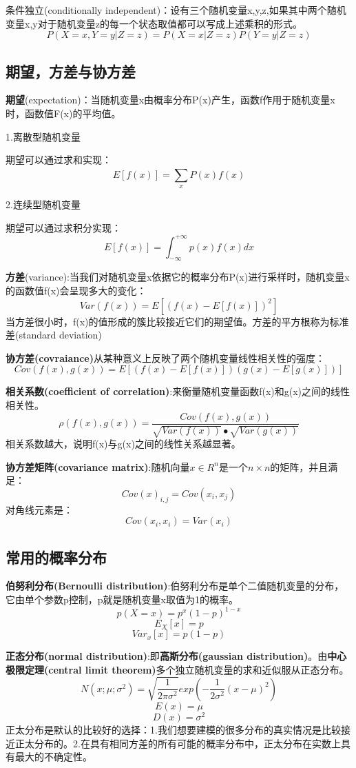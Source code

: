 \documentclass[openbib]{article}
\begin{document}
条件独立(conditionally independent)：设有三个随机变量x,y,z,如果其中两个随机变量x,y对于随机变量z的每一个状态取值都可以写成上述乘积的形式。
$$P(X=x,Y=y|Z=z)=P(X=x|Z=z)P(Y=y|Z=z)$$
\subsection{期望，方差与协方差}
\textbf{期望}(expectation)：当随机变量x由概率分布P(x)产生，函数f作用于随机变量x时，函数值F(x)的平均值。
\begin{center}
	1.离散型随机变量
\end{center}
期望可以通过求和实现：
$$E[f(x)]=\sum_{x}^{}P(x)f(x)$$
\begin{center}
	2.连续型随机变量
\end{center}
期望可以通过求积分实现：
$$E[f(x)]=\int_{-\infty}^{+\infty}p(x)f(x)dx$$

\textbf{方差}(variance):当我们对随机变量x依据它的概率分布P(x)进行采样时，随机变量x的函数值f(x)会呈现多大的变化：
$$Var(f(x))=E[(f(x)-E[f(x)])^2]$$
当方差很小时，f(x)的值形成的簇比较接近它们的期望值。方差的平方根称为标准差(standard deviation)

\textbf{协方差(covraiance)}从某种意义上反映了两个随机变量线性相关性的强度：
$$Cov(f(x),g(x))=E[(f(x)-E[f(x)])(g(x)-E[g(x)])]$$

\textbf{相关系数(coefficient of correlation)}:来衡量随机变量函数f(x)和g(x)之间的线性相关性。
$$\rho(f(x),g(x))=\frac{Cov(f(x),g(x))}{\sqrt{Var(f(x))}\bullet \sqrt{Var(g(x))}}$$
相关系数越大，说明f(x)与g(x)之间的线性关系越显著。

\textbf{协方差矩阵(covariance matrix)}:随机向量$x\in R^n$是一个$n \times n$的矩阵，并且满足：
$$Cov(x)_{i,j}=Cov(x_i, x_j)$$
对角线元素是：
$$Cov(x_i,x_i)=Var(x_i)$$
\subsection{常用的概率分布}
\textbf{伯努利分布(Bernoulli distribution)}:伯努利分布是单个二值随机变量的分布，它由单个参数p控制，p就是随机变量x取值为1的概率。
$$p(X=x)=p^x(1-p)^{1-x} $$
$$E_X[x]=p $$
$$Var_x[x]=p(1-p)$$

\textbf{正态分布(normal distribution)}:即\textbf{高斯分布(gaussian distribution)}。由\textbf{中心极限定理(central limit theorem)}多个独立随机变量的求和近似服从正态分布。
$$N(x;\mu;\sigma^2)=\sqrt{\frac{1}{2\pi \sigma^2}}exp(-\frac{1}{2\sigma^2}(x-\mu)^2)$$
$$E(x)=\mu$$
$$D(x)=\sigma^2$$
正太分布是默认的比较好的选择：1.我们想要建模的很多分布的真实情况是比较接近正太分布的。2.在具有相同方差的所有可能的概率分布中，正太分布在实数上具有最大的不确定性。
\end{document}
